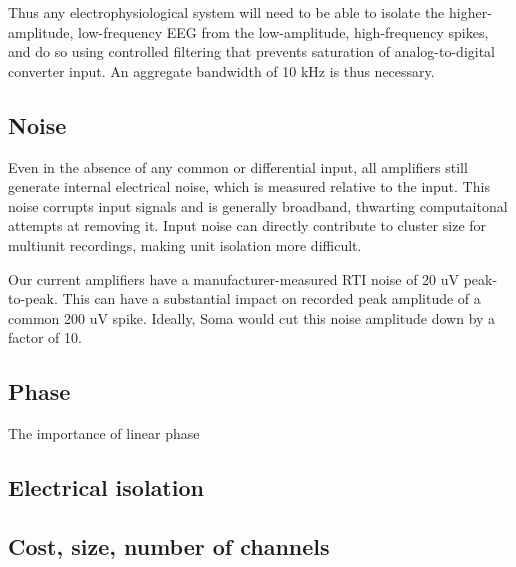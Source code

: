 Thus any electrophysiological system will need to be able to isolate
the higher-amplitude, low-frequency EEG from the low-amplitude,
high-frequency spikes, and do so using controlled filtering that
prevents saturation of analog-to-digital converter input. An aggregate
bandwidth of 10 kHz is thus necessary.

\subsection{Noise}
Even in the absence of any common or differential input, all
amplifiers still generate internal electrical noise, which is measured
relative to the input. This noise corrupts input signals and is
generally broadband, thwarting computaitonal attempts at removing it.
Input noise can directly contribute to cluster size for multiunit
recordings, making unit isolation more difficult.

Our current amplifiers have a manufacturer-measured RTI noise of 20 uV
peak-to-peak. This can have a substantial impact on recorded peak
amplitude of a common 200 uV spike. Ideally, Soma would cut this noise
amplitude down by a factor of 10.

\subsection{Phase}
 The importance of linear phase



\subsection{Electrical isolation} 

\subsection{Cost, size, number of channels}

